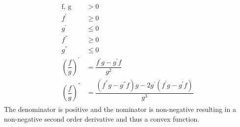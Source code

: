 \documentclass[a4paper]{article}
\begin{document}
\begin{Large}
\begin{enumerate}[label=\alph*)]
\begin{align}
			\begin{split}
			\text{f, g} & >0
			\\
			f^{'} &\geq 0
			\\
			g^{'} &\leq 0
			\\
			f^{''} & \geq 0
			\\
			g^{''} & \leq 0
			\\
			(\dfrac{f}{g})^{'} &= \dfrac{f^{'}g-g^{'}f}{g^2}
			\\
			(\dfrac{f}{g})^{''} &= \dfrac{(f^{''}g-g^{''}f)g-2g^{'}(f^{'}g-g^{'}f)}{g^3}
		\end{split}
	\end{align}
	The denominator is positive and the nominator is  non-negative resulting in a non-negative second order derivative and thus a convex function.
	\end{enumerate}
	\newpage

\end{Large}
\end{document}

